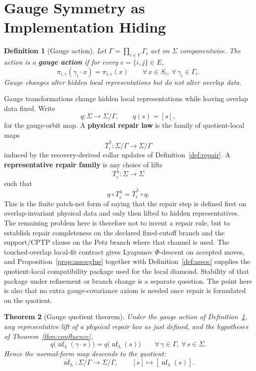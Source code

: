 \documentclass[11pt]{article}
\newtheorem{theorem}{Theorem}[section]
\newtheorem{definition}[theorem]{Definition}
\theoremstyle{remark}
\theoremstyle{plain}
\begin{document}
\section{Gauge Symmetry as Implementation Hiding}

\begin{definition}[Gauge action]\label{def:gauge}
Let $\Gamma = \prod_{i\in V}\Gamma_i$ act on $\Sigma$ componentwise. The action is a \textbf{gauge action} if for every $e=\{i,j\}\in E$,
\[
\pi_{i,e}(\gamma_i\cdot x)=\pi_{i,e}(x)
\qquad
\forall\, x\in S_i,\ \forall\, \gamma_i\in \Gamma_i.
\]
Gauge changes alter hidden local representations but do not alter overlap data.
\end{definition}

Gauge transformations change hidden local representations while leaving overlap data fixed. Write
\[
q:\Sigma\to \Sigma/\Gamma,
\qquad
q(s)=[s],
\]
for the gauge-orbit map. A \textbf{physical repair law} is the family of quotient-local maps
\[
\overline T_i^\lambda:\Sigma/\Gamma\to \Sigma/\Gamma
\]
induced by the recovery-derived collar updates of Definition~\ref{def:repair}. A
\textbf{representative repair family} is any choice of lifts
\[
T_i^\lambda:\Sigma\to\Sigma
\]
such that
\[
q\circ T_i^\lambda
=
\overline T_i^\lambda\circ q.
\]
This is the finite patch-net form of saying that the repair step is defined first on
overlap-invariant physical data and only then lifted to hidden representatives. The remaining
problem here is therefore not to invent a repair rule, but to establish repair completeness on
the declared fixed-cutoff branch and the support/CPTP clause on the Petz branch where that
channel is used. The touched-overlap local-fit contract gives Lyapunov \(\Phi\)-descent on
accepted moves, and Proposition~\ref{prop:assocglue} together with
Definition~\ref{def:assoc} supplies the quotient-local compatibility package used for the local
diamond. Stability of that package under refinement or branch change is a separate question.
The point here is also that no extra gauge-covariance axiom is needed once repair is formulated
on the quotient.

\begin{theorem}[Gauge quotient theorem]\label{thm:gauge}
Under the gauge action of Definition~\ref{def:gauge}, any representative lift of a physical repair
law as just defined, and the hypotheses of Theorem~\ref{thm:confluence},
\[
q\bigl(\operatorname{nf}_\lambda(\gamma\cdot s)\bigr)
=
q\bigl(\operatorname{nf}_\lambda(s)\bigr)
\qquad
\forall\, \gamma\in\Gamma,\ \forall\, s\in\Sigma.
\]
Hence the normal-form map descends to the quotient:
\[
\overline{\operatorname{nf}}_\lambda:\Sigma/\Gamma \to \Sigma/\Gamma,
\qquad
[s]\mapsto [\operatorname{nf}_\lambda(s)].
\]
\end{theorem}
\end{document}
